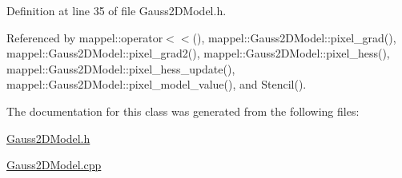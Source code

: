 Definition at line 35 of file Gauss2\+D\+Model.\+h.



Referenced by mappel\+::operator$<$$<$(), mappel\+::\+Gauss2\+D\+Model\+::pixel\+\_\+grad(), mappel\+::\+Gauss2\+D\+Model\+::pixel\+\_\+grad2(), mappel\+::\+Gauss2\+D\+Model\+::pixel\+\_\+hess(), mappel\+::\+Gauss2\+D\+Model\+::pixel\+\_\+hess\+\_\+update(), mappel\+::\+Gauss2\+D\+Model\+::pixel\+\_\+model\+\_\+value(), and Stencil().



The documentation for this class was generated from the following files\+:\begin{DoxyCompactItemize}
\item 
\hyperlink{Gauss2DModel_8h}{Gauss2\+D\+Model.\+h}\item 
\hyperlink{Gauss2DModel_8cpp}{Gauss2\+D\+Model.\+cpp}\end{DoxyCompactItemize}
